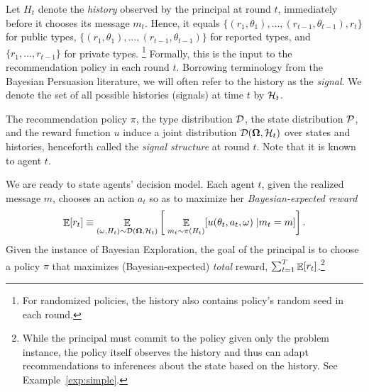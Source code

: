

Let $H_t$ denote the \emph{history} observed by the principal at round $t$, immediately before it chooses its message $m_t$. Hence, it equals $\{(r_1,\theta_1),\ldots,(r_{t-1},\theta_{t-1}),r_t\}$ for public types, $\{(r_1,\theta_1),\ldots,(r_{t-1},\theta_{t-1})\}$ for reported types, and $\{r_1,\ldots,r_{t-1}\}$ for private types.%
\footnote{For randomized policies, the history also contains policy's random seed in each round.}
Formally, this is the input to the recommendation policy in each round $t$. Borrowing terminology from the Bayesian Persuasion literature, we will often refer to the history as the {\em signal}. We denote the set of all possible histories (signals) at time $t$ by $\mathcal{H}_t$.


The recommendation policy $\pi$, the type distribution $\mathcal{D}$, the state distribution $\mathcal{P}$, and the reward function $u$ induce a joint distribution $\mathcal{D}(\bold{\Omega},\mathcal{H}_t)$ over states and histories, henceforth called the {\em signal structure} at round $t$. Note that it is known to agent $t$.

We are ready to state agents' decision model. Each agent $t$, given the realized message $m$, chooses an action $a_t$ so as to maximize her {\em Bayesian-expected reward}
$$\mathop{\mathbb{E}}[r_t]\equiv\mathop{\mathbb{E}}_{(\omega,H_t)\sim\mathcal{D}(\bold{\Omega},\mathcal{H}_t)}
\left[\; \mathop{\mathbb{E}}_{m_t\sim\pi(H_t)}[u(\theta_t,a_t,\omega)\;|m_t = m ]\right].$$
Given the instance of Bayesian Exploration, the goal of the principal is to choose a policy $\pi$ that maximizes (Bayesian-expected) {\em total} reward, \ie $\sum_{t=1}^T \mathop{\mathbb{E}}[r_t]$.\footnote{While the principal must commit to the policy given only the problem instance, the policy itself observes the history and thus can adapt recommendations to inferences about the state based on the history.  See Example~\ref{exp:simple}.}

